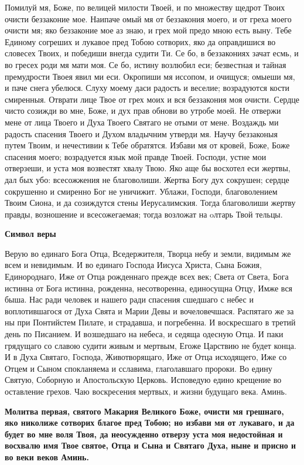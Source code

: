 Помилуй мя, Боже, по велицей милости Твоей, и по множеству щедрот Твоих очисти беззаконие мое. Наипаче омый мя от беззакония моего, и от греха моего очисти мя; яко беззаконие мое аз знаю, и грех мой предо мною есть выну. Тебе Единому согреших и лукавое пред Тобою сотворих, яко да оправдишися во словесех Твоих, и победиши внегда судити Ти. Се бо, в беззакониях зачат есмь, и во гресех роди мя мати моя. Се бо, истину возлюбил еси; безвестная и тайная премудрости Твоея явил ми еси. Окропиши мя иссопом, и очищуся; омыеши мя, и паче снега убелюся. Слуху моему даси радость и веселие; возрадуются кости смиренныя. Отврати лице Твое от грех моих и вся беззакония моя очисти. Сердце чисто созижди во мне, Боже, и дух прав обнови во утробе моей. Не отвержи мене от лица Твоего и Духа Твоего Святаго не отыми от мене. Воздаждь ми радость спасения Твоего и Духом владычним утверди мя. Научу беззаконыя путем Твоим, и нечестивии к Тебе обратятся. Избави мя от кровей, Боже, Боже спасения моего; возрадуется язык мой правде Твоей. Господи, устне мои отверзеши, и уста моя возвестят хвалу Твою. Яко аще бы восхотел еси жертвы, дал бых убо: всесожжения не благоволиши. Жертва Богу дух сокрушен; сердце сокрушенно и смиренно Бог не уничижит. Ублажи, Господи, благоволением Твоим Сиона, и да созиждутся стены Иерусалимския. Тогда благоволиши жертву правды, возношение и всесожегаемая; тогда возложат на oлтарь Твой тельцы.


\medskip
\bfseries Символ веры\normalfont{}\nopagebreak


  Верую во единаго Бога Отца, Вседержителя, Творца небу и земли, видимым же всем и невидимым.
  И во единаго Господа Иисуса Христа, Сына Божия, Единороднаго, Иже от Отца рожденнаго прежде всех век; Света от Света, Бога истинна от Бога истинна, рожденна, несотворенна, единосущна Отцу, Имже вся быша.
  Нас ради человек и нашего ради спасения сшедшаго с небес и воплотившагося от Духа Свята и Марии Девы и вочеловечшася.
  Распятаго же за ны при Понтийстем Пилате, и страдавша, и погребенна.
  И воскресшаго в третий день по Писанием.
  И возшедшаго на небеса, и седяща одесную Отца.
  И паки грядущаго со славою судити живым и мертвым, Егоже Царствию не будет конца.
  И в Духа Святаго, Господа, Животворящаго, Иже от Отца исходящего, Иже со Отцем и Сыном спокланяема и сславима, глаголавшаго пророки.
  Во едину Святую, Соборную и Апостольскую Церковь.
  Исповедую едино крещение во оставление грехов.
  Чаю воскресения мертвых, и жизни будущаго века. Аминь.
  

\medskip
\bfseries Молитва первая, святого Макария Великого\normalfont{}\nopagebreak
Боже, очисти мя грешнаго, яко николиже сотворих благое пред Тобою; но избави мя от лукаваго, и да будет во мне воля Твоя, да неосужденно отверзу уста моя недостойная и восхвалю имя Твое святое, Отца и Сына и Святаго Духа, ныне и присно и во веки веков Аминь. 


